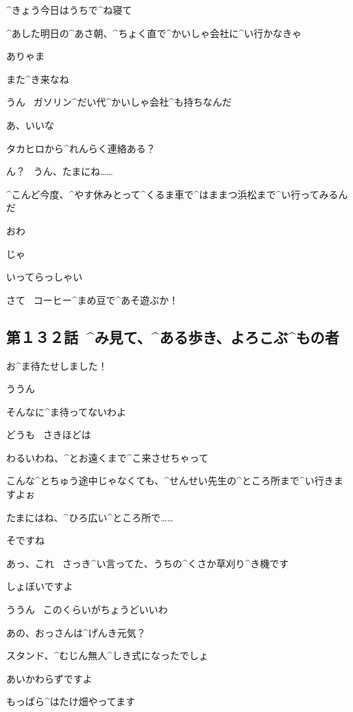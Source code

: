 \page[12]
\Makki ^{きょう}{今日}はうちで^{ね}{寝}て

\Makki ^{あした}{明日}の^{あさ}{朝}、^{ちょく}{直}で^{かいしゃ}{会社}に^{い}{行}かなきゃ

\Alpha ありゃま

\Alpha また^{き}{来}なね

\Makki うん
\ ガソリン^{だい}{代}^{かいしゃ}{会社}^{も}{持}ちなんだ

\Alpha あ、いいな

\page[13]
\Alpha タカヒロから^{れんらく}{連絡}ある？

\Makki ん？
\ うん、たまにね……

\Makki ^{こんど}{今度}、^{やす}{休}みとって^{くるま}{車}で^{はままつ}{浜松}まで^{い}{行}ってみるんだ

\Alpha おわ

\page[14]
\Makki じゃ

\Alpha いってらっしゃい

\page[15]
\Alpha さて
\ コーヒー^{まめ}{豆}で^{あそ}{遊}ぶか！


\subsection{第１３２話\ ^{み}{見}て、^{ある}{歩}き、よろこぶ^{もの}{者}}

\page[20]
\Alpha お^{ま}{待}たせしました！

\Sensei ううん

\Sensei そんなに^{ま}{待}ってないわよ

\Alpha どうも
\ さきほどは

\Sensei わるいわね、^{とお}{遠}くまで^{こ}{来}させちゃって

\Alpha こんな^{とちゅう}{途中}じゃなくても、^{せんせい}{先生}の^{ところ}{所}まで^{い}{行}きますよぉ

\Sensei たまにはね、^{ひろ}{広}い^{ところ}{所}で……

\page[21]
\Alpha そですね

\Alpha あっ、これ
\ さっき^{い}{言}ってた、うちの^{くさか}{草刈}り^{き}{機}です

\Alpha しょぼいですよ

\Sensei ううん
\ このくらいがちょうどいいわ

\page[22]
\Sensei あの、おっさんは^{げんき}{元気}？

\Sensei スタンド、^{むじん}{無人}^{しき}{式}になったでしょ

\Alpha あいかわらずですよ

\Alpha もっぱら^{はたけ}{畑}やってます

